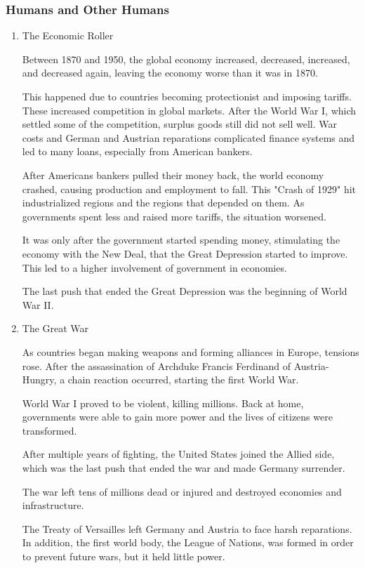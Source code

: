 \documentclass[11pt]{article}
\begin{document}
\subsubsection{Humans and Other Humans}
\label{sec:org864fb89}
\begin{enumerate}
\item The Economic Roller
\label{sec:org61dc28a}

Between 1870 and 1950, the global economy increased, decreased, increased, and decreased again, leaving the economy worse than it was in 1870.

This happened due to countries becoming protectionist and imposing tariffs. These increased competition in global markets. After the World War I, which settled some of the competition, surplus goods still did not sell well. War costs and German and Austrian reparations complicated finance systems and led to many loans, especially from American bankers.

After Americans bankers pulled their money back, the world economy crashed, causing production and employment to fall. This "Crash of 1929" hit industrialized regions and the regions that depended on them. As governments spent less and raised more tariffs, the situation worsened.

It was only after the government started spending money, stimulating the economy with the New Deal, that the Great Depression started to improve. This led to a higher involvement of government in economies.

The last push that ended the Great Depression was the beginning of World War II.

\item The Great War
\label{sec:orgd387f37}

As countries began making weapons and forming alliances in Europe, tensions rose. After the assassination of Archduke Francis Ferdinand of Austria-Hungry, a chain reaction occurred, starting the first World War.

World War I proved to be violent, killing millions. Back at home, governments were able to gain more power and the lives of citizens were transformed.

After multiple years of fighting, the United States joined the Allied side, which was the last push that ended the war and made Germany surrender.

The war left tens of millions dead or injured and destroyed economies and infrastructure.

The Treaty of Versailles left Germany and Austria to face harsh reparations. In addition, the first world body, the League of Nations, was formed in order to prevent future wars, but it held little power.


\end{enumerate}
\end{document}
